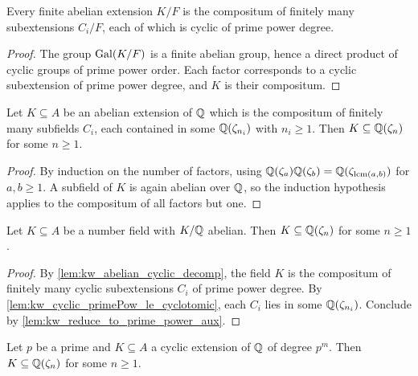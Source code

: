 \begin{lemma}
  \label{lem:kw_abelian_cyclic_decomp}
  \leanok
  Every finite abelian extension $K/F$ is the compositum of finitely many subextensions
  $C_i/F$, each of which is cyclic of prime power degree.
\end{lemma}

\begin{proof}
  \leanok
  The group $\mathrm{Gal}(K/F)$ is a finite abelian group, hence a direct product of cyclic groups of prime
  power order. Each factor corresponds to a cyclic subextension of prime power degree, and $K$ is
  their compositum.
\end{proof}

\begin{lemma}
  \label{lem:kw_reduce_to_prime_power_aux}
  \leanok
  Let $K \subseteq A$ be an abelian extension of $\mathbb{Q}$ which is the compositum of finitely many
  subfields $C_i$, each contained in some $\mathbb{Q}(\zeta_{n_i})$ with $n_i \geq 1$. Then
  $K \subseteq \mathbb{Q}(\zeta_n)$ for some $n \geq 1$.
\end{lemma}

\begin{proof}
  \leanok
  By induction on the number of factors, using $\mathbb{Q}(\zeta_a)\mathbb{Q}(\zeta_b) =
  \mathbb{Q}(\zeta_{\operatorname{lcm}(a,b)})$ for $a, b \geq 1$. A subfield of $K$ is again abelian over
  $\mathbb{Q}$, so the induction hypothesis applies to the compositum of all factors but one.
\end{proof}

\begin{lemma}
  \label{lem:kw_reduce_to_prime_power}
  \leanok
  Let $K \subseteq A$ be a number field with $K/\mathbb{Q}$ abelian. Then $K \subseteq \mathbb{Q}(\zeta_n)$ for
  some $n \geq 1$.
\end{lemma}

\begin{proof}
  \leanok
  By \ref{lem:kw_abelian_cyclic_decomp}, the field $K$ is the compositum of finitely many cyclic
  subextensions $C_i$ of prime power degree. By \ref{lem:kw_cyclic_primePow_le_cyclotomic},
  each $C_i$ lies in some $\mathbb{Q}(\zeta_{n_i})$. Conclude by \ref{lem:kw_reduce_to_prime_power_aux}.
\end{proof}

\begin{lemma}
  \label{lem:kw_cyclic_primePow_le_cyclotomic}
  \leanok
  Let $p$ be a prime and $K \subseteq A$ a cyclic extension of $\mathbb{Q}$ of degree $p^m$. Then
  $K \subseteq \mathbb{Q}(\zeta_n)$ for some $n \geq 1$.
\end{lemma}

